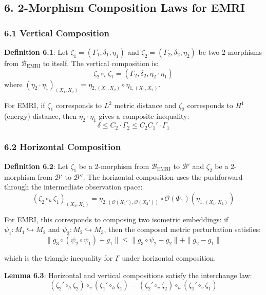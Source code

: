 \documentclass[
]{article}
\begin{document}
\subsection{6. 2-Morphism Composition Laws for
EMRI}\label{morphism-composition-laws-for-emri}

\subsubsection{6.1 Vertical Composition}\label{vertical-composition}

\textbf{Definition 6.1}: Let \(\zeta_1 = (\Gamma_1, \delta_1, \eta_1)\)
and \(\zeta_2 = (\Gamma_2, \delta_2, \eta_2)\) be two 2-morphisms from
\(\mathcal{B}_{\text{EMRI}}\) to itself. The vertical composition is:
\[\zeta_2 \circ_v \zeta_1 = (\Gamma_2, \delta_2, \eta_2 \cdot \eta_1)\]
where
\((\eta_2 \cdot \eta_1)_{(X_1, X_2)} = \eta_{2,(X_1, X_2)} \circ \eta_{1,(X_1, X_2)}\).

For EMRI, if \(\zeta_1\) corresponds to \(L^2\) metric distance and
\(\zeta_2\) corresponds to \(H^1\) (energy) distance, then
\(\eta_2 \cdot \eta_1\) gives a composite inequality:
\[\delta \leq C_2 \cdot \Gamma_2 \leq C_2 C_1' \cdot \Gamma_1\]

\subsubsection{6.2 Horizontal Composition}\label{horizontal-composition}

\textbf{Definition 6.2}: Let \(\zeta_1\) be a 2-morphism from
\(\mathcal{B}_{\text{EMRI}}\) to \(\mathcal{B}'\) and \(\zeta_2\) be a
2-morphism from \(\mathcal{B}'\) to \(\mathcal{B}''\). The horizontal
composition uses the pushforward through the intermediate observation
space:
\[(\zeta_2 \circ_h \zeta_1)_{(X_1, X_2)} = \eta_{2,(\mathcal{O}(X_1'), \mathcal{O}(X_2'))} \circ \mathcal{O}(\Phi_1)(\eta_{1,(X_1, X_2)})\]

For EMRI, this corresponds to composing two isometric embeddings: if
\(\psi_1: M_1 \hookrightarrow M_2\) and
\(\psi_2: M_2 \hookrightarrow M_3\), then the composed metric
perturbation satisfies:
\[\|g_3 \circ (\psi_2 \circ \psi_1) - g_1\| \leq \|g_3 \circ \psi_2 - g_2\| + \|g_2 - g_1\|\]

which is the triangle inequality for \(\Gamma\) under horizontal
composition.

\textbf{Lemma 6.3}: Horizontal and vertical compositions satisfy the
interchange law:
\[(\zeta_2' \circ_h \zeta_2) \circ_v (\zeta_1' \circ_h \zeta_1) = (\zeta_2' \circ_v \zeta_2) \circ_h (\zeta_1' \circ_v \zeta_1)\]
\end{document}
